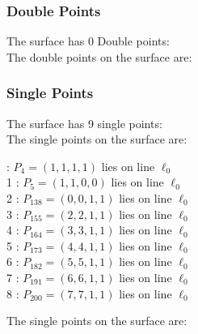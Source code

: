 \documentclass{article}
\begin{document}
{\subsubsection*{Double Points}
The surface has 0 Double points:\\
The double points on the surface are:\\
\begin{multicols}{2}
\noindent
\end{multicols}
\subsubsection*{Single Points}
The surface has 9 single points:\\
The single points on the surface are:\\
\begin{multicols}{2}
 : $P_{4}=( 1, 1, 1, 1 )$ lies on line $\ell_{0}$\\
1 : $P_{5}=( 1, 1, 0, 0 )$ lies on line $\ell_{0}$\\
2 : $P_{138}=( 0, 0, 1, 1 )$ lies on line $\ell_{0}$\\
3 : $P_{155}=( 2, 2, 1, 1 )$ lies on line $\ell_{0}$\\
4 : $P_{164}=( 3, 3, 1, 1 )$ lies on line $\ell_{0}$\\
5 : $P_{173}=( 4, 4, 1, 1 )$ lies on line $\ell_{0}$\\
6 : $P_{182}=( 5, 5, 1, 1 )$ lies on line $\ell_{0}$\\
7 : $P_{191}=( 6, 6, 1, 1 )$ lies on line $\ell_{0}$\\
8 : $P_{200}=( 7, 7, 1, 1 )$ lies on line $\ell_{0}$\\
\end{multicols}
The single points on the surface are:\\
}
\end{document}
